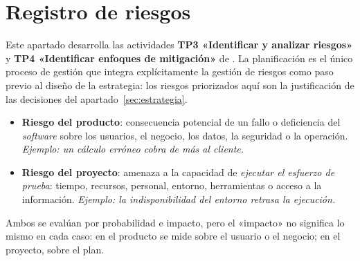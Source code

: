 \section{Registro de riesgos}
\label{sec:riesgos}

\begin{notanormativa}
Este apartado desarrolla las actividades \textbf{TP3 «Identificar y analizar riesgos»} y
\textbf{TP4 «Identificar enfoques de mitigación»} de . La planificación es el único
proceso de gestión que integra explícitamente la gestión de riesgos como paso previo al diseño
de la estrategia: los riesgos priorizados aquí son la justificación de las decisiones del
apartado~\ref{sec:estrategia}.
\end{notanormativa}

\begin{notanormativa}
\begin{itemize}
  \item \textbf{Riesgo del producto}: consecuencia potencial de un fallo o deficiencia del
        \emph{software} sobre los usuarios, el negocio, los datos, la seguridad o la operación.
        \emph{Ejemplo: un cálculo erróneo cobra de más al cliente.}
  \item \textbf{Riesgo del proyecto}: amenaza a la capacidad de \emph{ejecutar el esfuerzo de
        prueba}: tiempo, recursos, personal, entorno, herramientas o acceso a la información.
        \emph{Ejemplo: la indisponibilidad del entorno retrasa la ejecución.}
\end{itemize}
Ambos se evalúan por probabilidad e impacto, pero el «impacto» no significa lo mismo en cada
caso: en el producto se mide sobre el usuario o el negocio; en el proyecto, sobre el plan.
\end{notanormativa}

\begin{observacion}
\end{observacion}

